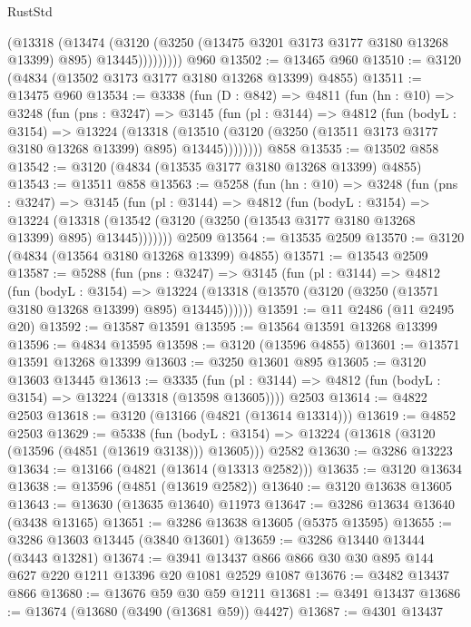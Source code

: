 \begin{lexlean}{RustStd}
\begin{coremodule}
{\begin{coremodule}
{{{{{{{{{{{{{{{{{{{{{{{{{{                (@13318
                  (@13474
                    (@3120
                      (@3250 (@13475 @3201 @3173 @3177 @3180 @13268 @13399) @895)
                      @13445)))))))))
    @960
@13502 := @13465 @960
@13510 := @3120 (@4834 (@13502 @3173 @3177 @3180 @13268 @13399) @4855)
@13511 := @13475 @960
@13534 := @3338
    (fun (D : @842) =>
    @4811
      (fun (hn : @10) =>
      @3248
        (fun (pns : @3247) =>
        @3145
          (fun (pl : @3144) =>
          @4812
            (fun (bodyL : @3154) =>
            @13224
              (@13318
                (@13510 (@3120 (@3250 (@13511 @3173 @3177 @3180 @13268 @13399) @895) @13445))))))))
    @858
@13535 := @13502 @858
@13542 := @3120 (@4834 (@13535 @3177 @3180 @13268 @13399) @4855)
@13543 := @13511 @858
@13563 := @5258
    (fun (hn : @10) =>
    @3248
      (fun (pns : @3247) =>
      @3145
        (fun (pl : @3144) =>
        @4812
          (fun (bodyL : @3154) =>
          @13224
            (@13318 (@13542 (@3120 (@3250 (@13543 @3177 @3180 @13268 @13399) @895) @13445)))))))
    @2509
@13564 := @13535 @2509
@13570 := @3120 (@4834 (@13564 @3180 @13268 @13399) @4855)
@13571 := @13543 @2509
@13587 := @5288
    (fun (pns : @3247) =>
    @3145
      (fun (pl : @3144) =>
      @4812
        (fun (bodyL : @3154) =>
        @13224 (@13318 (@13570 (@3120 (@3250 (@13571 @3180 @13268 @13399) @895) @13445))))))
@13591 := @11 @2486 (@11 @2495 @20)
@13592 := @13587 @13591
@13595 := @13564 @13591 @13268 @13399
@13596 := @4834 @13595
@13598 := @3120 (@13596 @4855)
@13601 := @13571 @13591 @13268 @13399
@13603 := @3250 @13601 @895
@13605 := @3120 @13603 @13445
@13613 := @3335
    (fun (pl : @3144) => @4812 (fun (bodyL : @3154) => @13224 (@13318 (@13598 @13605))))
    @2503
@13614 := @4822 @2503
@13618 := @3120 (@13166 (@4821 (@13614 @13314)))
@13619 := @4852 @2503
@13629 := @5338
    (fun (bodyL : @3154) => @13224 (@13618 (@3120 (@13596 (@4851 (@13619 @3138))) @13605)))
    @2582
@13630 := @3286 @13223
@13634 := @13166 (@4821 (@13614 (@13313 @2582)))
@13635 := @3120 @13634
@13638 := @13596 (@4851 (@13619 @2582))
@13640 := @3120 @13638 @13605
@13643 := @13630 (@13635 @13640) @11973
@13647 := @3286 @13634 @13640 (@3438 @13165)
@13651 := @3286 @13638 @13605 (@5375 @13595)
@13655 := @3286 @13603 @13445 (@3840 @13601)
@13659 := @3286 @13440 @13444 (@3443 @13281)
@13674 := @3941 @13437 @866 @866 @30 @30 @895 @144 @627 @220 @1211 @13396 @20 @1081 @2529 @1087
@13676 := @3482 @13437 @866
@13680 := @13676 @59 @30 @59 @1211
@13681 := @3491 @13437
@13686 := @13674 (@13680 (@3490 (@13681 @59)) @4427)
@13687 := @4301 @13437
}}}}}}}}}}}}}}}}}}}}}}}}}}
\end{coremodule}}
\end{coremodule}
\end{lexlean}
